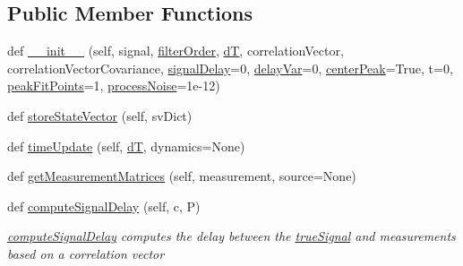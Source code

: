 \subsection*{Public Member Functions}
\begin{DoxyCompactItemize}
\item 
def \hyperlink{classSignalCorrelationSubstate_1_1CorrelationFilter_aae730dbd572e8b43fcab8c78832e8911}{\+\_\+\+\_\+init\+\_\+\+\_\+} (self, signal, \hyperlink{classSignalCorrelationSubstate_1_1CorrelationFilter_a4b49b7bd52c1346cca0342942a5bbbb6}{filter\+Order}, \hyperlink{classSignalCorrelationSubstate_1_1CorrelationFilter_a500e4823c314d54a21f236b6b896c8eb}{dT}, correlation\+Vector, correlation\+Vector\+Covariance, \hyperlink{classSignalCorrelationSubstate_1_1CorrelationFilter_a01e35890dee1d79bd0e4f9e82cb16e3f}{signal\+Delay}=0, \hyperlink{classSignalCorrelationSubstate_1_1CorrelationFilter_a34d52beb18c131f2305689d48f612a5a}{delay\+Var}=0, \hyperlink{classSignalCorrelationSubstate_1_1CorrelationFilter_a8e53182c2ff431a6a545a265cda6ba48}{center\+Peak}=True, t=0, \hyperlink{classSignalCorrelationSubstate_1_1CorrelationFilter_a85a73739e9bb0a7f20886a812a3afa83}{peak\+Fit\+Points}=1, \hyperlink{classSignalCorrelationSubstate_1_1CorrelationFilter_abbd9598dd2d237abb1eef86ba427da7f}{process\+Noise}=1e-\/12)
\item 
def \hyperlink{classSignalCorrelationSubstate_1_1CorrelationFilter_a94b5211aa159578344974b52f3b9f92e}{store\+State\+Vector} (self, sv\+Dict)
\item 
def \hyperlink{classSignalCorrelationSubstate_1_1CorrelationFilter_a07a8c37a30c3d0a057049e0ff2eac67f}{time\+Update} (self, \hyperlink{classSignalCorrelationSubstate_1_1CorrelationFilter_a500e4823c314d54a21f236b6b896c8eb}{dT}, dynamics=None)
\item 
def \hyperlink{classSignalCorrelationSubstate_1_1CorrelationFilter_ae7338456be781e322eba5bce4e41199f}{get\+Measurement\+Matrices} (self, measurement, source=None)
\item 
def \hyperlink{classSignalCorrelationSubstate_1_1CorrelationFilter_ace04b6e310f321192715c76ec2ac6b52}{compute\+Signal\+Delay} (self, c, P)
\begin{DoxyCompactList}\small\item\em \hyperlink{classSignalCorrelationSubstate_1_1CorrelationFilter_ace04b6e310f321192715c76ec2ac6b52}{compute\+Signal\+Delay} computes the delay between the \hyperlink{classSignalCorrelationSubstate_1_1CorrelationFilter_a67ff75effd8a8a7e34f0f3e8c56ef491}{true\+Signal} and measurements based on a correlation vector \end{DoxyCompactList}\item 

\end{DoxyCompactItemize}
